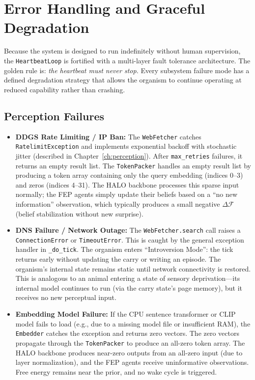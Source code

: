 \section{Error Handling and Graceful Degradation}

Because the system is designed to run indefinitely without human supervision, the \texttt{HeartbeatLoop} is fortified with a multi-layer fault tolerance architecture. The golden rule is: \textit{the heartbeat must never stop.} Every subsystem failure mode has a defined degradation strategy that allows the organism to continue operating at reduced capability rather than crashing.

\subsection{Perception Failures}

\begin{itemize}
    \item \textbf{DDGS Rate Limiting / IP Ban:} The \texttt{WebFetcher} catches \texttt{RatelimitException} and implements exponential backoff with stochastic jitter (described in Chapter~\ref{ch:perception}). After \texttt{max\_retries} failures, it returns an empty result list. The \texttt{TokenPacker} handles an empty result list by producing a token array containing only the query embedding (indices 0--3) and zeros (indices 4--31). The HALO backbone processes this sparse input normally; the FEP agents simply update their beliefs based on a ``no new information'' observation, which typically produces a small negative $\Delta\mathcal{F}$ (belief stabilization without new surprise).

    \item \textbf{DNS Failure / Network Outage:} The \texttt{WebFetcher.search} call raises a \texttt{ConnectionError} or \texttt{TimeoutError}. This is caught by the general exception handler in \texttt{\_do\_tick}. The organism enters ``Introversion Mode'': the tick returns early without updating the carry or writing an episode. The organism's internal state remains static until network connectivity is restored. This is analogous to an animal entering a state of sensory deprivation---its internal model continues to run (via the carry state's page memory), but it receives no new perceptual input.

    \item \textbf{Embedding Model Failure:} If the CPU sentence transformer or CLIP model fails to load (e.g., due to a missing model file or insufficient RAM), the \texttt{Embedder} catches the exception and returns zero vectors. The zero vectors propagate through the \texttt{TokenPacker} to produce an all-zero token array. The HALO backbone produces near-zero outputs from an all-zero input (due to layer normalization), and the FEP agents receive uninformative observations. Free energy remains near the prior, and no wake cycle is triggered.
\end{itemize}

